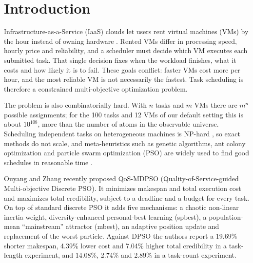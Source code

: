 \documentclass[pdflatex,sn-basic]{sn-jnl}
\theoremstyle{thmstyleone}%
\theoremstyle{thmstyletwo}%
\theoremstyle{thmstylethree}%
\begin{document}

\maketitle

\section{Introduction}\label{sec1}
Infrastructure-as-a-Service (IaaS) clouds let users rent virtual machines (VMs) by the hour instead of owning hardware \citep{mell2011}. Rented VMs differ in processing speed, hourly price and reliability, and a scheduler must decide which VM executes each submitted task. That single decision fixes when the workload finishes, what it costs and how likely it is to fail. These goals conflict: faster VMs cost more per hour, and the most reliable VM is not necessarily the fastest. Task scheduling is therefore a constrained multi-objective optimization problem.

The problem is also combinatorially hard. With $n$ tasks and $m$ VMs there are $m^{n}$ possible assignments; for the 100 tasks and 12 VMs of our default setting this is about $10^{108}$, more than the number of atoms in the observable universe. Scheduling independent tasks on heterogeneous machines is NP-hard \citep{garey1979,ibarra1977}, so exact methods do not scale, and meta-heuristics such as genetic algorithms, ant colony optimization and particle swarm optimization (PSO) \citep{kennedy1995} are widely used to find good schedules in reasonable time \citep{houssein2021}.

Ouyang and Zhang \citeyearpar{ouyang2025} recently proposed QoS-MDPSO (Quality-of-Service-guided Multi-objective Discrete PSO). It minimizes makespan and total execution cost and maximizes total credibility, subject to a deadline and a budget for every task. On top of standard discrete PSO it adds five mechanisms: a chaotic non-linear inertia weight, diversity-enhanced personal-best learning (spbest), a population-mean ``mainstream'' attractor (mbest), an adaptive position update and replacement of the worst particle. Against DPSO the authors report a 19.69\% shorter makespan, 4.39\% lower cost and 7.04\% higher total credibility in a task-length experiment, and 14.08\%, 2.74\% and 2.89\% in a task-count experiment.
\end{document}

